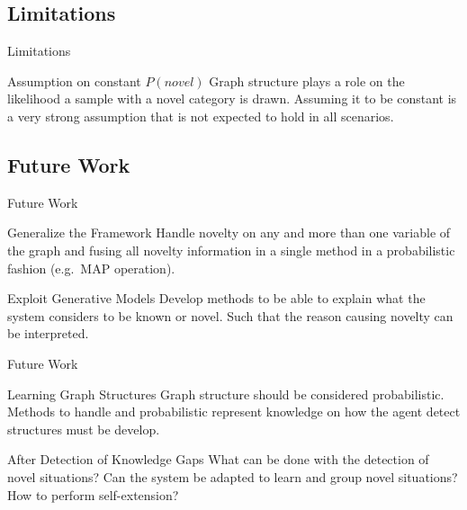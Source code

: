 \documentclass[compress]{beamer}
\begin{document}
\subsection{Limitations}
\begin{frame}{Limitations}
\begin{block}{Assumption on constant $P(novel)$}
Graph structure plays a role on the likelihood a sample with a novel
category is drawn. Assuming it to be constant is a very strong assumption
that is not expected to hold in all scenarios.
\end{block}
\end{frame}

\subsection{Future Work}
\begin{frame}{Future Work}
  \begin{block}{Generalize the Framework}
  Handle novelty on any and more than one variable of the graph and fusing
  all novelty information in a single method in a probabilistic fashion (e.g.\ MAP operation).
  \end{block}
  \begin{block}{Exploit Generative Models}
  Develop methods to be able to explain what the system considers to be known or novel.
  Such that the reason causing novelty can be interpreted.
  \end{block}
\end{frame}
\begin{frame}{Future Work}
  \begin{block}{Learning Graph Structures}
  Graph structure should be considered probabilistic. Methods to handle and probabilistic
  represent knowledge on how the agent detect structures must be develop.
  \end{block}
  \begin{block}{After Detection of Knowledge Gaps}
  What can be done with the detection of novel situations? Can the system be adapted
  to learn and group novel situations? How to perform self-extension?
  \end{block}
\end{frame}
\end{document}
